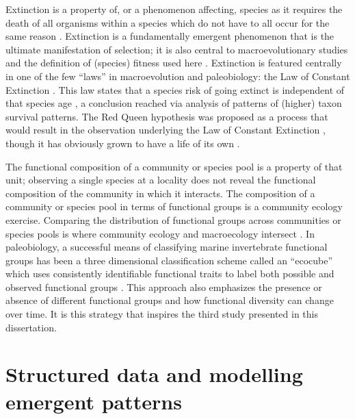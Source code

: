 Extinction is a property of, or a phenomenon affecting, species as it requires the death of all organisms within a species which do not have to all occur for the same reason \citep{Simpson2016a}. Extinction is a fundamentally emergent phenomenon that is the ultimate manifestation of selection; it is also central to macroevolutionary studies and the definition of (species) fitness used here \citep{Cooper1984}. Extinction is featured centrally in one of the few ``laws'' in macroevolution and paleobiology: the Law of Constant Extinction \citep{VanValen1973,Liow2011a}. This law states that a species risk of going extinct is independent of that species age \citep{VanValen1973,Liow2011a}, a conclusion reached via analysis of patterns of (higher) taxon survival patterns. The Red Queen hypothesis was proposed as a process that would result in the observation underlying the Law of Constant Extinction \citep{VanValen1973}, though it has obviously grown to have a life of its own \citep{Liow2011a}.

The functional composition of a community or species pool is a property of that unit; observing a single species at a locality does not reveal the functional composition of the community in which it interacts. The composition of a community or species pool in terms of functional groups is a community ecology exercise. Comparing the distribution of functional groups across communities or species pools is where community ecology and macroecology intersect \citep{Mcgill2006,Brown1995,Smith2008b}. In paleobiology, a successful means of classifying marine invertebrate functional groups has been a three dimensional classification scheme called an ``ecocube'' which uses consistently identifiable functional traits to label both possible and observed functional groups \citep{Bush2007,Bambach2007}. This approach also emphasizes the presence or absence of different functional groups and how functional diversity can change over time. It is this strategy that inspires the third study presented in this dissertation.



\section{Structured data and modelling emergent patterns}



